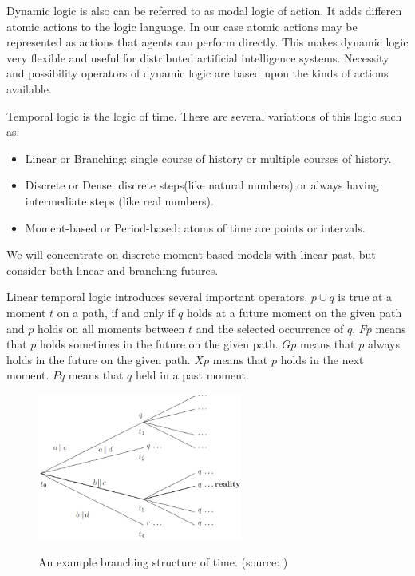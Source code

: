 Dynamic logic is also can be referred to as modal logic of action. It adds differen atomic actions to the logic language. In our case atomic actions may be represented as actions that agents can perform directly. This makes dynamic logic very flexible and useful for distributed artificial intelligence systems. Necessity and possibility operators of dynamic logic are based upon the kinds of actions available. \cite{Kozen_90}

Temporal logic is the logic of time. There are several variations of this logic such as:
\begin{itemize}
  \item Linear or Branching: single course of history or multiple courses of history.
  \item Discrete or Dense: discrete steps(like natural numbers) or always having intermediate steps (like real numbers).
  \item Moment-based or Period-based: atoms of time are points or intervals.
\end{itemize}
We will concentrate on discrete moment-based models with linear past, but consider both linear and branching futures.

Linear temporal logic introduces several important operators. $p\cup q$ is true at a moment $t$ on a path, if and only if $q$ holds at a future moment on
the given path and $p$ holds on all moments between $t$ and the selected occurrence of $q$. $Fp$ means that $p$ holds sometimes in the future on the given path. $Gp$ means that $p$ always holds in the future on the given path. $Xp$ means that $p$ holds in the next moment. $Pq$ means that $q$ held in a past moment. \cite{Singh_99}
%
\begin{figure}[h!]
\caption{An example branching structure of time. (source: \cite{Singh_99})}
\centering
\includegraphics[width=0.6\textwidth]{images/branching_logic.png}
\label{fig:branching_time}
\end{figure}

